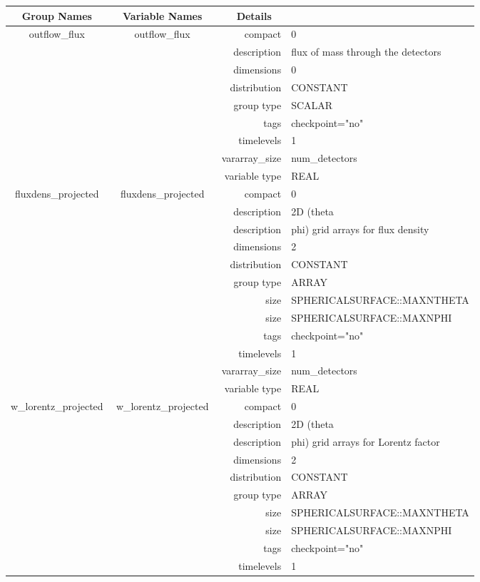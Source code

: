 \begin{tabular*}{150mm}{|c|c@{\extracolsep{\fill}}|rl|} \hline 
~ {\bf Group Names} ~ & ~ {\bf Variable Names} ~  &{\bf Details} ~ & ~\\ 
\hline 
outflow\_flux & outflow\_flux & compact & 0 \\ 
 &  & description & flux of mass through the detectors \\ 
 &  & dimensions & 0 \\ 
 &  & distribution & CONSTANT \\ 
 &  & group type & SCALAR \\ 
 &  & tags & checkpoint="no" \\ 
 &  & timelevels & 1 \\ 
 &  & vararray\_size & num\_detectors \\ 
 &  & variable type & REAL \\ 
\hline 
fluxdens\_projected & fluxdens\_projected & compact & 0 \\ 
 &  & description & 2D (theta \\ 
& ~ & description & phi) grid arrays for flux density \\ 
 &  & dimensions & 2 \\ 
 &  & distribution & CONSTANT \\ 
 &  & group type & ARRAY \\ 
 &  & size & SPHERICALSURFACE::MAXNTHETA \\ 
& ~ & size & SPHERICALSURFACE::MAXNPHI \\ 
 &  & tags & checkpoint="no" \\ 
 &  & timelevels & 1 \\ 
 &  & vararray\_size & num\_detectors \\ 
 &  & variable type & REAL \\ 
\hline 
w\_lorentz\_projected & w\_lorentz\_projected & compact & 0 \\ 
 &  & description & 2D (theta \\ 
& ~ & description & phi) grid arrays for Lorentz factor \\ 
 &  & dimensions & 2 \\ 
 &  & distribution & CONSTANT \\ 
 &  & group type & ARRAY \\ 
 &  & size & SPHERICALSURFACE::MAXNTHETA \\ 
& ~ & size & SPHERICALSURFACE::MAXNPHI \\ 
 &  & tags & checkpoint="no" \\ 
 &  & timelevels & 1 \\ 

\end{tabular*}
